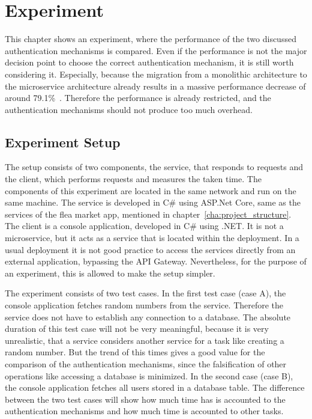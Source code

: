 \chapter{Experiment}
\label{cha:experiment}
This chapter shows an experiment, where the performance of the two discussed authentication mechanisms is compared.
Even if the performance is not the major decision point to choose the correct authentication mechanism, it is still worth considering it.
Especially, because the migration from a monolithic architecture to the microservice architecture already results in a massive performance decrease of around 79.1\%~\cite{ueda2016workload}.
Therefore the performance is already restricted, and the authentication mechanisms should not produce too much overhead.

\section{Experiment Setup}
The setup consists of two components, the service, that responds to requests and the client, which performs requests and measures the taken time.
The components of this experiment are located in the same network and run on the same machine.
The service is developed in C\# using ASP.Net Core, same as the services of the flea market app, mentioned in chapter~\ref{cha:project_structure}.
The client is a console application, developed in C\# using .NET.
It is not a microservice, but it acts as a service that is located within the deployment.
In a usual deployment it is not good practice to access the services directly from an external application, bypassing the API Gateway.
Nevertheless, for the purpose of an experiment, this is allowed to make the setup simpler. 

The experiment consists of two test cases.
In the first test case (case A), the console application fetches random numbers from the service.
Therefore the service does not have to establish any connection to a database.
The absolute duration of this test case will not be very meaningful, because it is very unrealistic, that a service considers another service for a task like creating a random number.
But the trend of this times gives a good value for the comparison of the authentication mechanisms, since the falsification of other operations like accessing a database is minimized.
In the second case (case B), the console application fetches all users stored in a database table.
The difference between the two test cases will show how much time has is accounted to the authentication mechanisms and how much time is accounted to other tasks.

